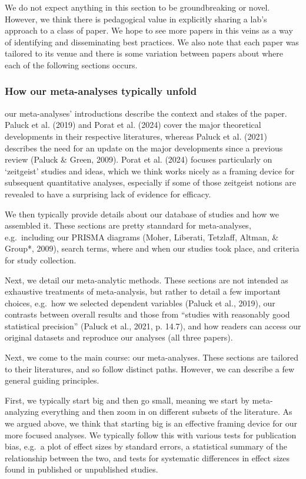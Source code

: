 \documentclass[
  man]{apa6}
\begin{document}
We do not expect anything in this section to be groundbreaking or novel. However, we think there is pedagogical value in explicitly sharing a lab's approach to a class of paper. We hope to see more papers in this veins as a way of identifying and disseminating best practices. We also note that each paper was tailored to its venue and there is some variation between papers about where each of the following sections occurs.

\subsubsection{How our meta-analyses typically unfold}\label{how-our-meta-analyses-typically-unfold}

our meta-analyses' introductions describe the context and stakes of the paper. Paluck et al. (2019) and Porat et al. (2024) cover the major theoretical developments in their respective literatures, whereas Paluck et al. (2021) describes the need for an update on the major developments since a previous review (Paluck \& Green, 2009). Porat et al. (2024) focuses particularly on `zeitgeist' studies and ideas, which we think works nicely as a framing device for subsequent quantitative analyses, especially if some of those zeitgeist notions are revealed to have a surprising lack of evidence for efficacy.

We then typically provide details about our database of studies and how we assembled it. These sections are pretty stanndard for meta-analyses, e.g.~including our PRISMA diagrams (Moher, Liberati, Tetzlaff, Altman, \& Group*, 2009), search terms, where and when our studies took place, and criteria for study collection.

Next, we detail our meta-analytic methods. These sections are not intended as exhaustive treatments of meta-analysis, but rather to detail a few important choices, e.g.~how we selected dependent variables (Paluck et al., 2019), our contrasts between overall results and those from ``studies with reasonably good statistical precision'' (Paluck et al., 2021, p. 14.7), and how readers can access our original datasets and reproduce our analyses (all three papers).

Next, we come to the main course: our meta-analyses. These sections are tailored to their literatures, and so follow distinct paths. However, we can describe a few general guiding principles.

First, we typically start big and then go small, meaning we start by meta-analyzing everything and then zoom in on different subsets of the literature. As we argued above, we think that starting big is an effective framing device for our more focused analyses. We typically follow this with various tests for publication bias, e.g.~a plot of effect sizes by standard errors, a statistical summary of the relationship between the two, and tests for systematic differences in effect sizes found in published or unpublished studies.
\end{document}
